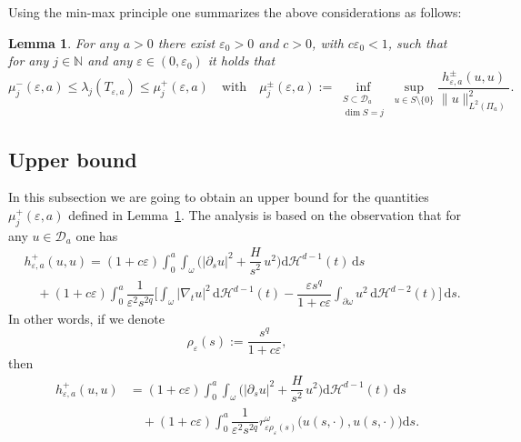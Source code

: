 \documentclass[11pt,oneside,reqno,a4paper]{amsart}
\newcommand{\dd}{\mathrm{d}}
\newcommand{\cD}{\mathcal{D}}
\newcommand{\N}{\mathbb{N}}
\renewcommand{\H}{\mathcal{H}}
\newcommand{\eps}{\varepsilon}
\newtheorem{lemma}[theorem]{Lemma}
\theoremstyle{definition}
\begin{document}
Using the min-max principle one summarizes the above considerations as follows:
\begin{lemma}\label{lem35}
	For any $a>0$ there exist $\eps_0>0$ and $c>0$, with $c \eps_0<1$, such that for any $j\in\N$ and any $\eps\in(0,\eps_0)$ it holds that
	\[
	\mu^-_j(\eps,a)\le \lambda_j(T_{\eps,a})\le \mu^+_j(\eps,a)
	\quad
	\text{with}
	\quad
	\mu^\pm_j(\eps,a):=\inf_{\substack{S\subset\cD_a\\ \dim S=j}}\sup_{u\in S\setminus\{0\}}\dfrac{h^\pm_{\eps,a}(u,u)}{\|u\|^2_{L^2(\Pi_a)}}.
	\]
\end{lemma}











\subsection{Upper bound}
In this subsection we are going to obtain an upper bound for the quantities $\mu^+_j(\eps,a)$
defined in Lemma~\ref{lem35}. The analysis is based on the observation that for any
$u\in \cD_a$ one has
\begin{align*}
	&h^{+}_{\eps,a}(u,u)= (1+c\eps)\int_0^a \int_{\omega}\bigg(|\partial_su|^2+\dfrac{H}{s^2}\,u^2\bigg)\dd\H^{d-1}(t)\,\dd s\\
	&\quad +(1+c\eps)\int_0^a \dfrac{1}{\eps^2s^{2q}}\bigg[\int_{\omega}|\nabla_tu|^2\,\dd\H^{d-1}(t) -\dfrac{\eps s^q}{1+c\eps}
	\int_{\partial\omega}u^2\,\dd\H^{d-2}(t)\bigg]\,\dd s.
\end{align*}
In other words, if we denote
\[
\rho_\eps(s):=\dfrac{s^q}{1+c\eps},
\]
then
\begin{equation}
	\label{hplus1}	
\begin{aligned}
h^{+}_{\eps,a}(u,u)&= (1+c\eps)\int_0^a \int_{\omega}\bigg(|\partial_su|^2+\dfrac{H}{s^2}\,u^2\bigg)\dd\H^{d-1}(t)\,\dd s\\
&\quad
+(1+c\eps)\int_0^a \dfrac{1}{\eps^2s^{2q}} r^\omega_{\eps\rho_\eps(s)}\big(u(s,\cdot),u(s,\cdot)\big)\dd s.
\end{aligned}
\end{equation}
\end{document}

